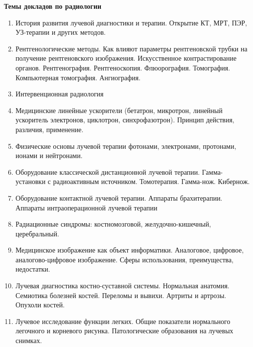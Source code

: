 \documentclass[14pt,a4paper]{article}
\author{\href{mailto:www-kirill.pilipenko@yandex.ru}{К.С.~Пилипенко}} %
\date{\selectlanguage{russian}\today}
\begin{document}
\begin{center}
    \textbf{\Large{Темы докладов по радиологии}}
\end{center}
    \begin{enumerate}
        \item История развития лучевой диагностики и терапии. Открытие КТ, МРТ, ПЭР, УЗ-терапии и других методов.
        \item Рентгенологические методы. Как влияют параметры рентгеновской трубки на получение рентгеновского изображения. Искусственное контрастирование органов. Рентгенография. Рентгеноскопия. Флюорография. Томография. Компьютерная томография. Ангиография.
        \item Интервенционная радиология
        \item Медицинские линейные ускорители (бетатрон, микротрон, линейный ускоритель электронов, циклотрон, синхрофазотрон). Принцип действия, различия, применение.
        \item Физические основы лучевой терапии фотонами, электронами, протонами, ионами и нейтронами.
        \item Оборудование классической дистанционной лучевой терапии. Гамма-установки с радиоактивным источником.  Томотерапия. Гамма-нож. Кибернож.
        \item Оборудование контактной лучевой терапии. Аппараты брахитерапии. Аппараты интраоперационной лучевой терапии
        \item Радиационные синдромы: костномозговой, желудочно-кишечный, церебральный. 
        \item Медицинское изображение как объект информатики. Аналоговое, цифровое, аналогово-цифровое изображение. Сферы использования, преимущества, недостатки.
        \item Лучевая диагностика костно-суставной системы. Нормальная анатомия. Семиотика болезней костей. Переломы и вывихи. Артриты и артрозы. Опухоли костей.
        \item Лучевое исследование функции легких. Общие показатели нормального легочного и корневого рисунка. Патологические образования на лучевых снимках.
    \end{enumerate}
\end{document}
